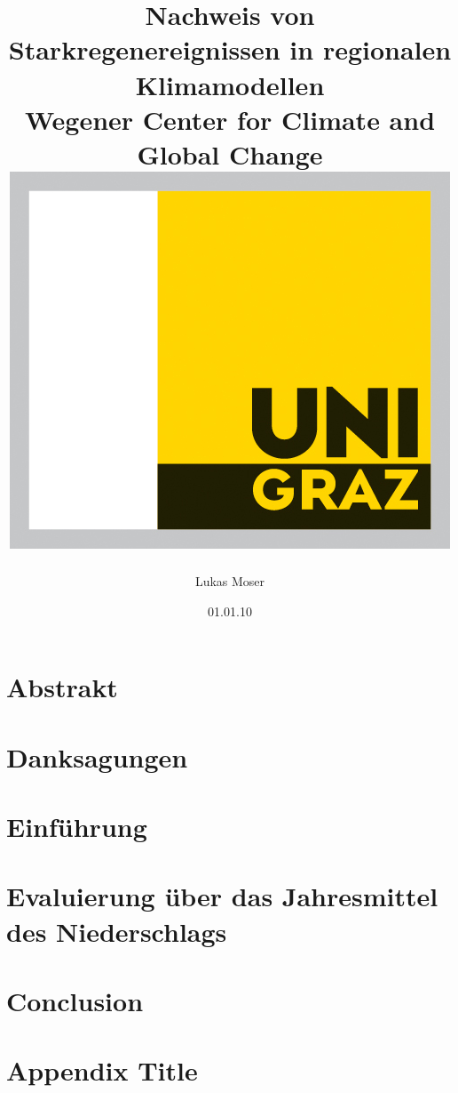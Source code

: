\documentclass[12pt,twoside]{report}
\title{
	{Nachweis von Starkregenereignissen in regionalen Klimamodellen}\\
	{\large Wegener Center for Climate and Global Change}\\
	{\includegraphics{university.jpg}}
}
\author{Lukas Moser}
\date{01.01.10}
\begin{document}
	\maketitle
	\pagestyle{fancy}
	\chapter*{Abstrakt}
	
	\chapter*{Danksagungen}
	
	\tableofcontents
	
	\chapter{Einführung}
	

	\chapter{Evaluierung über das Jahresmittel des Niederschlags}
	
	
	
	\chapter{Conclusion}
	
	
	\appendix
	\chapter{Appendix Title}
	
	\printbibliography
\end{document}
